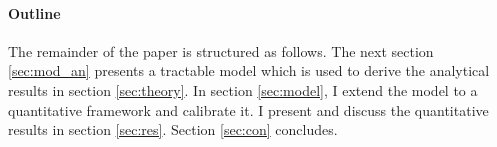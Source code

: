 \begin{comment}
The less sector-specific knowledge is, the more should the government tax carbon to prevent the fossil sector from growing too much through spillovers from other sectors. The optimal carbon tax increases over time since knowledge spillovers from other sectors drag research to the fossil sector countering the effect of the carbon tax to make fossil energy more expensive. 
On the other hand, knowledge spillovers from the fossil sector allow the economy to profit from fossil research in early years while meeting the net-zero emission limit later on. Then, the green sector grows fast enough to mitigate the costs of meeting the net-zero emission limit in later years albeit more research is allocated to the fossil sector. 

Importance of fossil research 
Research in the fossil sector is especially important to consumption growth for two reasons. First, the fossil sector is the more productive one compared to green energy. \citep{Acemoglu2012TheChange} show that in this case the periods necessary for the economy to grow at the same rate as without policy intervention are increasing in the productivity gap. Simply because more growth in the green sector is required  to catch up with the technology level in the fossil sector. Second, the model features decreasing returns to research within a sector. When all scientists were allocated to one sector, it would be growth enhancing to reallocate some scientists to other sectors to equalize the returns to research. To meet the emission limit, the economy has to bear these costs. 

\end{comment}



\paragraph{Outline}
The remainder of the paper is structured as follows. The next section \ref{sec:mod_an} presents a tractable model which is used to derive the analytical results in section \ref{sec:theory}. In section \ref{sec:model}, I extend the model to a quantitative framework and calibrate it. I present and discuss the quantitative results in section \ref{sec:res}. Section \ref{sec:con} concludes.
